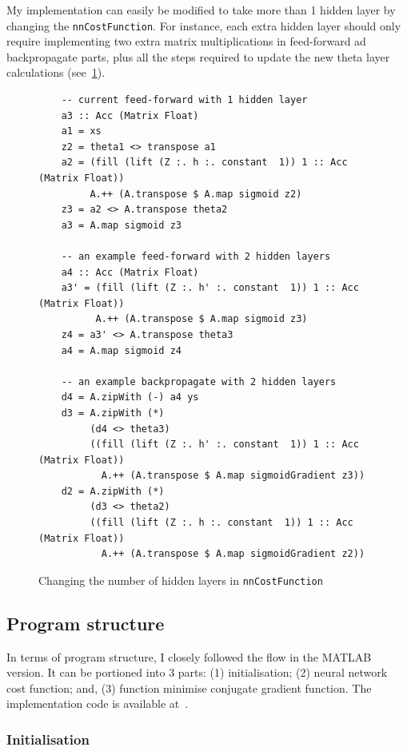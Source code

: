My implementation can easily be modified to take more than 1 hidden layer by changing the \texttt{nnCostFunction}. For instance, each extra hidden layer should only require implementing two extra matrix multiplications in feed-forward ad backpropagate parts, plus all the steps required to update the new theta layer calculations (see~\ref{fig:nnCostFunction.hiddenlayers}).

\begin{figure}
  \begin{lstlisting}
    -- current feed-forward with 1 hidden layer
    a3 :: Acc (Matrix Float)
    a1 = xs 
    z2 = theta1 <> transpose a1 
    a2 = (fill (lift (Z :. h :. constant  1)) 1 :: Acc (Matrix Float)) 
         A.++ (A.transpose $ A.map sigmoid z2) 
    z3 = a2 <> A.transpose theta2 
    a3 = A.map sigmoid z3
    
    -- an example feed-forward with 2 hidden layers
    a4 :: Acc (Matrix Float)
    a3' = (fill (lift (Z :. h' :. constant  1)) 1 :: Acc (Matrix Float))
          A.++ (A.transpose $ A.map sigmoid z3)
    z4 = a3' <> A.transpose theta3
    a4 = A.map sigmoid z4
    
    -- an example backpropagate with 2 hidden layers
    d4 = A.zipWith (-) a4 ys
    d3 = A.zipWith (*) 
         (d4 <> theta3)
         ((fill (lift (Z :. h' :. constant  1)) 1 :: Acc (Matrix Float)) 
           A.++ (A.transpose $ A.map sigmoidGradient z3)) 
    d2 = A.zipWith (*) 
         (d3 <> theta2)
         ((fill (lift (Z :. h :. constant  1)) 1 :: Acc (Matrix Float)) 
           A.++ (A.transpose $ A.map sigmoidGradient z2)) 
  \end{lstlisting}
  \caption{Changing the number of hidden layers in \texttt{nnCostFunction}}
  \label{fig:nnCostFunction.hiddenlayers}
\end{figure}

\subsection{Program structure} \label{se:impl.program.struct}

In terms of program structure, I closely followed the flow in the MATLAB version. It can be portioned into 3 parts: (1) initialisation; (2) neural network cost function; and, (3) function minimise conjugate gradient function. The implementation code is available at~\cite{McDJeo}.

\subsubsection{Initialisation} \label{se:impl.init}

